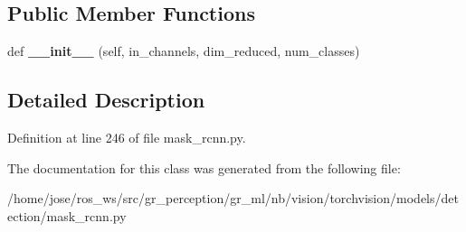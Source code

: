 \subsection*{Public Member Functions}
\begin{DoxyCompactItemize}
\item 
\mbox{\label{classtorchvision_1_1models_1_1detection_1_1mask__rcnn_1_1MaskRCNNPredictor_a42010c17aa066105d9f585911d15e03b}} 
def {\bfseries \+\_\+\+\_\+init\+\_\+\+\_\+} (self, in\+\_\+channels, dim\+\_\+reduced, num\+\_\+classes)
\end{DoxyCompactItemize}


\subsection{Detailed Description}


Definition at line 246 of file mask\+\_\+rcnn.\+py.



The documentation for this class was generated from the following file\+:\begin{DoxyCompactItemize}
\item 
/home/jose/ros\+\_\+ws/src/gr\+\_\+perception/gr\+\_\+ml/nb/vision/torchvision/models/detection/mask\+\_\+rcnn.\+py\end{DoxyCompactItemize}
